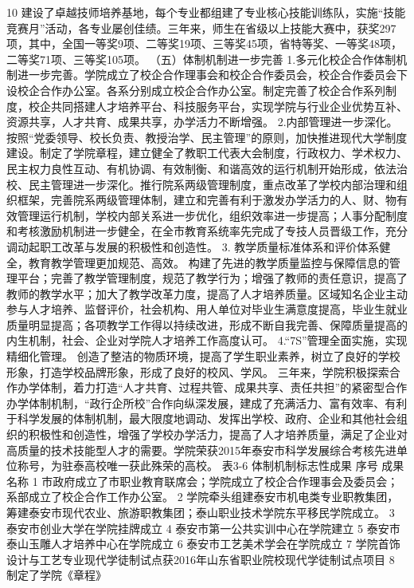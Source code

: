 10
建设了卓越技师培养基地，每个专业都组建了专业核心技能训练队，实施“技能竞赛月”活动，各专业屡创佳绩。三年来，师生在省级以上技能大赛中，获奖297项，其中，全国一等奖9项、二等奖19项、三等奖45项，省特等奖、一等奖48项，二等奖71项、三等奖105项。
（五）体制机制进一步完善
1.多元化校企合作体制机制进一步完善。学院成立了校企合作理事会和校企合作委员会，校企合作委员会下设校企合作办公室。各系分别成立校企合作办公室。制定完善了校企合作系列制度，校企共同搭建人才培养平台、科技服务平台，实现学院与行业企业优势互补、资源共享，人才共育、成果共享，办学活力不断增强。
 2.内部管理进一步深化。按照“党委领导、校长负责、教授治学、民主管理”的原则，加快推进现代大学制度建设。制定了学院章程，建立健全了教职工代表大会制度，行政权力、学术权力、民主权力良性互动、有机协调、有效制衡、和谐高效的运行机制开始形成，依法治校、民主管理进一步深化。推行院系两级管理制度，重点改革了学校内部治理和组织框架，完善院系两级管理体制，建立和完善有利于激发办学活力的人、财、物有效管理运行机制，学校内部关系进一步优化，组织效率进一步提高；人事分配制度和考核激励机制进一步健全，在全市教育系统率先完成了专技人员晋级工作，充分调动起职工改革与发展的积极性和创造性。
3. 教学质量标准体系和评价体系健全，教育教学管理更加规范、高效。
构建了先进的教学质量监控与保障信息的管理平台；完善了教学管理制度，规范了教学行为；增强了教师的责任意识，提高了教师的教学水平；加大了教学改革力度，提高了人才培养质量。区域知名企业主动参与人才培养、监督评价，社会机构、用人单位对毕业生满意度提高，毕业生就业质量明显提高；各项教学工作得以持续改进，形成不断自我完善、保障质量提高的内生机制，社会、企业对学院人才培养工作高度认可。
4.“7S”管理全面实施，实现精细化管理。
创造了整洁的物质环境，提高了学生职业素养，树立了良好的学校形象，打造学校品牌形象，形成了良好的校风、学风。
三年来，学院积极探索合作办学体制，着力打造“人才共育、过程共管、成果共享、责任共担”的紧密型合作办学体制机制，“政行企所校”合作向纵深发展，建成了充满活力、富有效率、有利于科学发展的体制机制，最大限度地调动、发挥出学校、政府、企业和其他社会组织的积极性和创造性，增强了学校办学活力，提高了人才培养质量，满足了企业对高质量的技术技能型人才的需要。学院荣获2015年泰安市科学发展综合考核先进单位称号，为驻泰高校唯一获此殊荣的高校。
表3-6 体制机制标志性成果
序号
成果名称
1
市政府成立了市职业教育联席会；学院成立了校企合作理事会及委员会；系部成立了校企合作工作办公室。
2
学院牵头组建泰安市机电类专业职教集团，筹建泰安市现代农业、旅游职教集团；泰山职业技术学院东平移民学院成立。
3
泰安市创业大学在学院挂牌成立
4
泰安市第一公共实训中心在学院建立
5
泰安市泰山玉雕人才培养中心在学院成立
6
泰安市工艺美术学会在学院成立
7
学院首饰设计与工艺专业现代学徒制试点获2016年山东省职业院校现代学徒制试点项目
8
制定了学院《章程》
